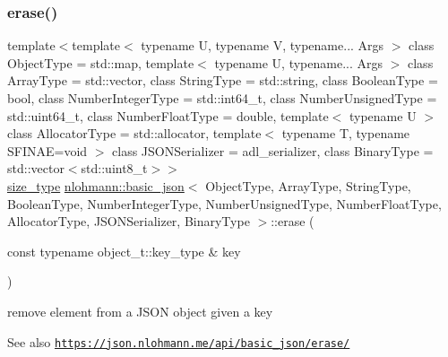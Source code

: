 \subsubsection{\texorpdfstring{erase()}{erase()}\hspace{0.1cm}{\footnotesize\ttfamily [3/4]}}
{\footnotesize\ttfamily template$<$template$<$ typename U, typename V, typename... Args $>$ class Object\+Type = std\+::map, template$<$ typename U, typename... Args $>$ class Array\+Type = std\+::vector, class String\+Type  = std\+::string, class Boolean\+Type  = bool, class Number\+Integer\+Type  = std\+::int64\+\_\+t, class Number\+Unsigned\+Type  = std\+::uint64\+\_\+t, class Number\+Float\+Type  = double, template$<$ typename U $>$ class Allocator\+Type = std\+::allocator, template$<$ typename T, typename S\+F\+I\+N\+A\+E=void $>$ class J\+S\+O\+N\+Serializer = adl\+\_\+serializer, class Binary\+Type  = std\+::vector$<$std\+::uint8\+\_\+t$>$$>$ \\
\hyperlink{classnlohmann_1_1basic__json_a3ada29bca70b4965f6fd37ec1c8f85f7}{size\+\_\+type} \hyperlink{classnlohmann_1_1basic__json}{nlohmann\+::basic\+\_\+json}$<$ Object\+Type, Array\+Type, String\+Type, Boolean\+Type, Number\+Integer\+Type, Number\+Unsigned\+Type, Number\+Float\+Type, Allocator\+Type, J\+S\+O\+N\+Serializer, Binary\+Type $>$\+::erase (\begin{DoxyParamCaption}\item[{const typename object\+\_\+t\+::key\+\_\+type \&}]{key }\end{DoxyParamCaption})\hspace{0.3cm}{\ttfamily [inline]}}



remove element from a J\+S\+ON object given a key 

\begin{DoxySeeAlso}{See also}
\href{https://json.nlohmann.me/api/basic_json/erase/}{\tt https\+://json.\+nlohmann.\+me/api/basic\+\_\+json/erase/} 
\end{DoxySeeAlso}
\mbox{\label{classnlohmann_1_1basic__json_a221b943d3228488c14225e55f726cc26}} 
